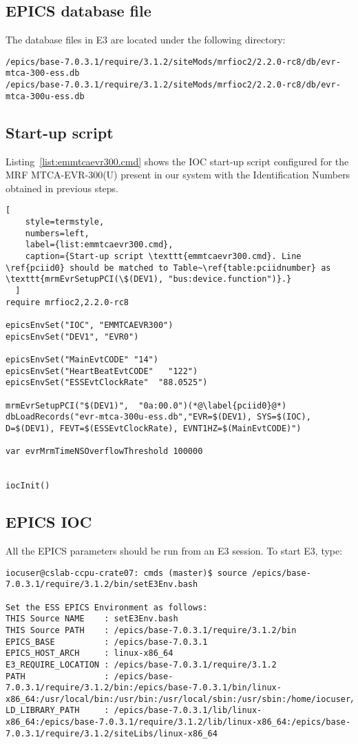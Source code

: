 \documentclass[11pt
  , a4paper
  , article
  , oneside
  , showtrims
]{memoir}
\begin{document}
{\subsection{EPICS database file}
The database files in E3 are located under the following directory:
\begin{lstlisting}[style=termstyle]
/epics/base-7.0.3.1/require/3.1.2/siteMods/mrfioc2/2.2.0-rc8/db/evr-mtca-300-ess.db
/epics/base-7.0.3.1/require/3.1.2/siteMods/mrfioc2/2.2.0-rc8/db/evr-mtca-300u-ess.db
\end{lstlisting}

\subsection{Start-up script}
Listing~\ref{list:emmtcaevr300.cmd} shows the IOC start-up script configured for the MRF MTCA-EVR-300(U) present in our system with the Identification Numbers obtained in previous steps.
\begin{lstlisting}[
    style=termstyle,
    numbers=left,
    label={list:emmtcaevr300.cmd},
    caption={Start-up script \texttt{emmtcaevr300.cmd}. Line \ref{pciid0} should be matched to Table~\ref{table:pciidnumber} as \texttt{mrmEvrSetupPCI(\$(DEV1), "bus:device.function")}.}
  ]
require mrfioc2,2.2.0-rc8

epicsEnvSet("IOC", "EMMTCAEVR300")
epicsEnvSet("DEV1", "EVR0")

epicsEnvSet("MainEvtCODE" "14")
epicsEnvSet("HeartBeatEvtCODE"   "122")
epicsEnvSet("ESSEvtClockRate"  "88.0525")

mrmEvrSetupPCI("$(DEV1)",  "0a:00.0")(*@\label{pciid0}@*)
dbLoadRecords("evr-mtca-300u-ess.db","EVR=$(DEV1), SYS=$(IOC), D=$(DEV1), FEVT=$(ESSEvtClockRate), EVNT1HZ=$(MainEvtCODE)")

var evrMrmTimeNSOverflowThreshold 100000


iocInit()

\end{lstlisting}

\subsection{EPICS IOC}
All the EPICS parameters should be run from an E3 session. To start E3, type:
\begin{lstlisting}[style=termstyle]
iocuser@cslab-ccpu-crate07: cmds (master)$ source /epics/base-7.0.3.1/require/3.1.2/bin/setE3Env.bash

Set the ESS EPICS Environment as follows:
THIS Source NAME    : setE3Env.bash
THIS Source PATH    : /epics/base-7.0.3.1/require/3.1.2/bin
EPICS_BASE          : /epics/base-7.0.3.1
EPICS_HOST_ARCH     : linux-x86_64
E3_REQUIRE_LOCATION : /epics/base-7.0.3.1/require/3.1.2
PATH                : /epics/base-7.0.3.1/require/3.1.2/bin:/epics/base-7.0.3.1/bin/linux-x86_64:/usr/local/bin:/usr/bin:/usr/local/sbin:/usr/sbin:/home/iocuser/.local/bin:/home/iocuser/bin
LD_LIBRARY_PATH     : /epics/base-7.0.3.1/lib/linux-x86_64:/epics/base-7.0.3.1/require/3.1.2/lib/linux-x86_64:/epics/base-7.0.3.1/require/3.1.2/siteLibs/linux-x86_64


\end{lstlisting}}
\end{document}
